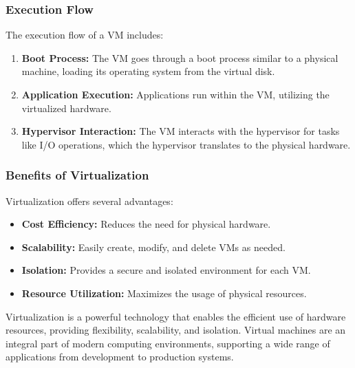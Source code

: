 \subsubsection{Execution Flow}
The execution flow of a VM includes:
\begin{enumerate}
    \item \textbf{Boot Process:} The VM goes through a boot process similar to a physical machine, loading its operating system from the virtual disk.
    \item \textbf{Application Execution:} Applications run within the VM, utilizing the virtualized hardware.
    \item \textbf{Hypervisor Interaction:} The VM interacts with the hypervisor for tasks like I/O operations, which the hypervisor translates to the physical hardware.
\end{enumerate}

\subsubsection{Benefits of Virtualization}
Virtualization offers several advantages:
\begin{itemize}
    \item \textbf{Cost Efficiency:} Reduces the need for physical hardware.
    \item \textbf{Scalability:} Easily create, modify, and delete VMs as needed.
    \item \textbf{Isolation:} Provides a secure and isolated environment for each VM.
    \item \textbf{Resource Utilization:} Maximizes the usage of physical resources.
\end{itemize}

Virtualization is a powerful technology that enables the efficient use of hardware resources, providing flexibility, scalability, and isolation. Virtual machines are an integral part of modern computing environments, supporting a wide range of applications from development to production systems.
